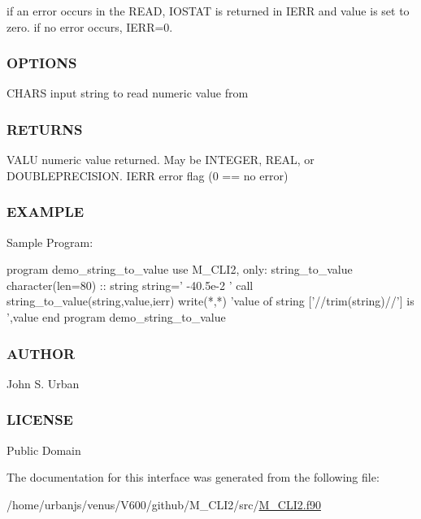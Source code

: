 if an error occurs in the R\+E\+AD, I\+O\+S\+T\+AT is returned in I\+E\+RR and value is set to zero. if no error occurs, I\+E\+RR=0. \subsubsection*{O\+P\+T\+I\+O\+NS}

C\+H\+A\+RS input string to read numeric value from \subsubsection*{R\+E\+T\+U\+R\+NS}

V\+A\+LU numeric value returned. May be I\+N\+T\+E\+G\+ER, R\+E\+AL, or D\+O\+U\+B\+L\+E\+P\+R\+E\+C\+I\+S\+I\+ON. I\+E\+RR error flag (0 == no error) \subsubsection*{E\+X\+A\+M\+P\+LE}

Sample Program\+: \begin{DoxyVerb} program demo_string_to_value
 use M_CLI2, only: string_to_value
 character(len=80) :: string
    string=' -40.5e-2 '
    call string_to_value(string,value,ierr)
    write(*,*) 'value of string ['//trim(string)//'] is ',value
 end program demo_string_to_value
\end{DoxyVerb}
 \subsubsection*{A\+U\+T\+H\+OR}

John S. Urban \subsubsection*{L\+I\+C\+E\+N\+SE}

Public Domain 

The documentation for this interface was generated from the following file\+:\begin{DoxyCompactItemize}
\item 
/home/urbanjs/venus/\+V600/github/\+M\+\_\+\+C\+L\+I2/src/\mbox{\hyperlink{M__CLI2_8f90}{M\+\_\+\+C\+L\+I2.\+f90}}\end{DoxyCompactItemize}
